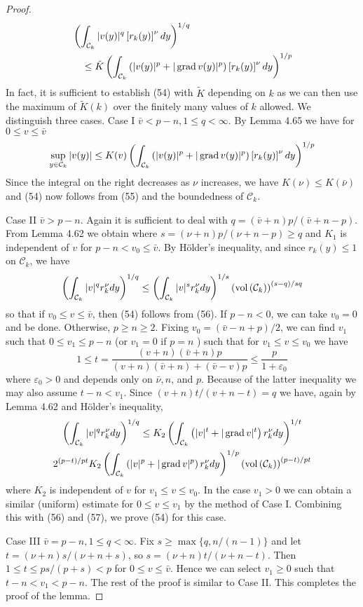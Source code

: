 \begin{proof}
  \[
  \begin{aligned}
  & \left(\int_{\mathcal{C}_k}|v(y)|^q\left[r_k(y)\right]^\nu d y\right)^{1 / q} \\
  & \quad \leq \tilde{K}\left(\int_{\mathcal{C}_k}\left(|v(y)|^p+|\operatorname{grad} v(y)|^p\right)\left[r_k(y)\right]^\nu d y\right)^{1 / p}
  \end{aligned}
  \]
  In fact, it is sufficient to establish (54) with $\tilde{K}$ depending on $k$ as we can then use the maximum of $\tilde{K}(k)$ over the finitely many values of $k$ allowed. We distinguish three cases.
  Case I $\bar{v}<p-n, 1 \leq q<\infty$. By Lemma 4.65 we have for $0 \leq v \leq \bar{v}$
  \[
  \sup _{y \in \mathcal{C}_k}|v(y)| \leq K(v)\left(\int_{\mathcal{C}_k}\left(|v(y)|^p+|\operatorname{grad} v(y)|^p\right)\left[r_k(y)\right]^\nu d y\right)^{1 / p}
  \]
  Since the integral on the right decreases as $\nu$ increases, we have $K(\nu) \leq K(\bar{\nu})$ and (54) now follows from (55) and the boundedness of $\mathcal{C}_k$.
  
  Case II $\bar{v}>p-n$. Again it is sufficient to deal with $q=(\bar{v}+n) p /(\bar{v}+n-p)$. From Lemma 4.62 we obtain
  where $s=(\nu+n) p /(\nu+n-p) \geq q$ and $K_1$ is independent of $v$ for $p-n<v_0 \leq \bar{v}$. By Hölder's inequality, and since $r_k(y) \leq 1$ on $\mathcal{C}_k$, we have
  \[
  \left(\int_{\mathcal{C}_k}|v|^q r_k^\nu d y\right)^{1 / q} \leq\left(\int_{\mathcal{C}_k}|v|^s r_k^\nu d y\right)^{1 / s}\left(\operatorname{vol}\left(\mathcal{C}_k\right)\right)^{(s-q) / s q}
  \]
  so that if $v_0 \leq v \leq \bar{v}$, then (54) follows from (56).
  If $p-n<0$, we can take $v_0=0$ and be done. Otherwise, $p \geq n \geq 2$. Fixing $v_0=(\bar{v}-n+p) / 2$, we can find $v_1$ such that $0 \leq v_1 \leq p-n$ (or $v_1=0$ if $p=n$ ) such that for $v_1 \leq v \leq v_0$ we have
  \[
  1 \leq t=\frac{(v+n)(\bar{v}+n) p}{(v+n)(\bar{v}+n)+(\bar{v}-v) p} \leq \frac{p}{1+\varepsilon_0}
  \]
  where $\varepsilon_0>0$ and depends only on $\bar{\nu}, n$, and $p$. Because of the latter inequality we may also assume $t-n<v_1$. Since $(v+n) t /(v+n-t)=q$ we have, again by Lemma 4.62 and Hölder's inequality,
  \[
  \begin{gathered}
  \left(\int_{\mathcal{C}_k}|v|^q r_k^\nu d y\right)^{1 / q} \leq K_2\left(\int_{\mathcal{C}_k}\left(|v|^t+|\operatorname{grad} v|^t\right) r_k^\nu d y\right)^{1 / t} \\
  2^{(p-t) / p t} K_2\left(\int_{\mathcal{C}_k}\left(|v|^p+|\operatorname{grad} v|^p\right) r_k^\nu d y\right)^{1 / p}\left(\operatorname{vol}\left(\mathcal{C}_k\right)\right)^{(p-t) / p t}
  \end{gathered}
  \]
  where $K_2$ is independent of $v$ for $v_1 \leq v \leq v_0$.
  In the case $v_1>0$ we can obtain a similar (uniform) estimate for $0 \leq v \leq v_1$ by the method of Case I. Combining this with (56) and (57), we prove (54) for this case.

  Case III $\bar{v}=p-n, 1 \leq q<\infty$. Fix $s \geq \max \{q, n /(n-1)\}$ and let $t=(\nu+n) s /(\nu+n+s)$, so $s=(\nu+n) t /(\nu+n-t)$. Then $1 \leq t \leq p s /(p+s)<p$ for $0 \leq v \leq \bar{v}$. Hence we can select $v_1 \geq 0$ such that $t-n<v_1<p-n$. The rest of the proof is similar to Case II. This completes the proof of the lemma.
\end{proof}


